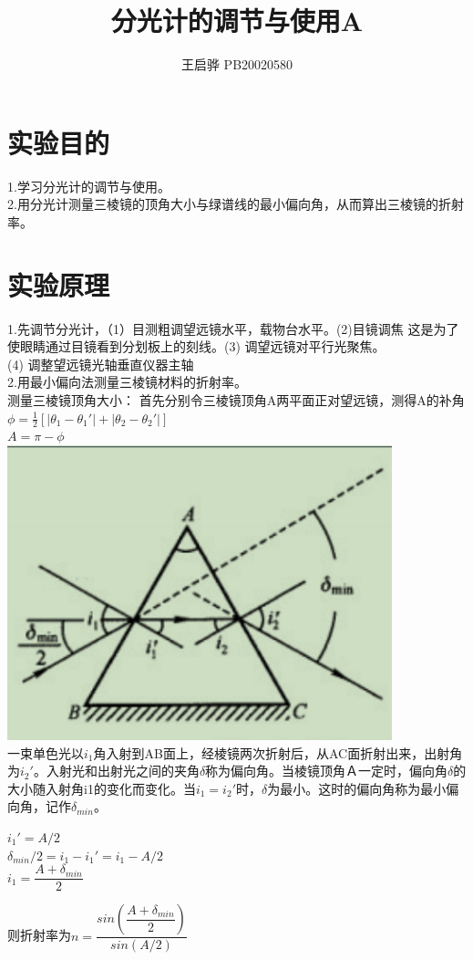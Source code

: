 \documentclass{report}
\title{分光计的调节与使用A}
\author{王启骅 PB20020580}
\begin{document}
	\maketitle
	\section{实验目的}
1.学习分光计的调节与使用。\\
2.用分光计测量三棱镜的顶角大小与绿谱线的最小偏向角，从而算出三棱镜的折射率。
	\section{实验原理}
1.先调节分光计，（1）目测粗调望远镜水平，载物台水平。\quad(2)目镜调焦
这是为了使眼睛通过目镜看到分划板上的刻线。\quad(3) 调望远镜对平行光聚焦。\\
\quad(4) 调整望远镜光轴垂直仪器主轴\\
2.用最小偏向法测量三棱镜材料的折射率。\\
测量三棱镜顶角大小：
首先分别令三棱镜顶角A两平面正对望远镜，测得A的补角\\
$ \phi=\frac{1}{2}[|\theta_1-\theta_1'|+|\theta_2-\theta_2'|] $ \\
$   A=\pi-\phi $\\
\includegraphics{1}\\
一束单色光以$ i_1 $角入射到AB面上，经棱镜两次折射后，从AC面折射出来，出射角为$ i_2' $。入射光和出射光之间的夹角$ \delta $称为偏向角。当棱镜顶角Ａ一定时，偏向角$ \delta $的大小随入射角i1的变化而变化。当$ i_1=i_2' $时，$ \delta $为最小。这时的偏向角称为最小偏向角，记作$ \delta_{min} $。
\begin{center}
	$ i_1'=A/2 $\\
	$ \delta_{min}/2=i_1-i_1'=i_1-A/2 $\\
	$ i_1=\dfrac{A+\delta_{min}}{2} $\\
\end{center}
	则折射率为$ n=\dfrac{sin(\dfrac{A+\delta_{min}}{2})}{sin(A/2)} $
\end{document}
